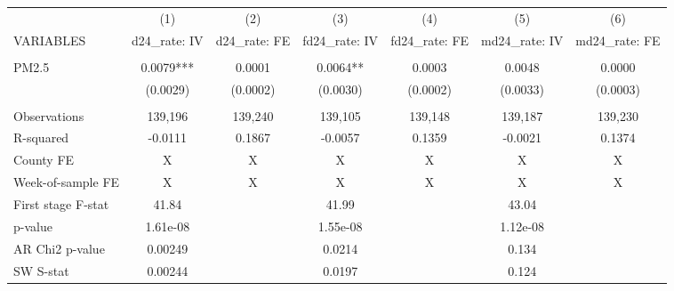 \begin{tabular}{lcccccc} \hline
 & (1) & (2) & (3) & (4) & (5) & (6) \\
VARIABLES & d24\_rate: IV & d24\_rate: FE & fd24\_rate: IV & fd24\_rate: FE & md24\_rate: IV & md24\_rate: FE \\ \hline
 &  &  &  &  &  &  \\
PM2.5 & 0.0079*** & 0.0001 & 0.0064** & 0.0003 & 0.0048 & 0.0000 \\
 & (0.0029) & (0.0002) & (0.0030) & (0.0002) & (0.0033) & (0.0003) \\
 &  &  &  &  &  &  \\
Observations & 139,196 & 139,240 & 139,105 & 139,148 & 139,187 & 139,230 \\
R-squared & -0.0111 & 0.1867 & -0.0057 & 0.1359 & -0.0021 & 0.1374 \\
County FE & X & X & X & X & X & X \\
Week-of-sample FE & X & X & X & X & X & X \\
First stage F-stat & 41.84 &  & 41.99 &  & 43.04 &  \\
p-value & 1.61e-08 &  & 1.55e-08 &  & 1.12e-08 &  \\
AR Chi2 p-value & 0.00249 &  & 0.0214 &  & 0.134 &  \\
 SW S-stat & 0.00244 &  & 0.0197 &  & 0.124 &  \\ \hline
\end{tabular}
